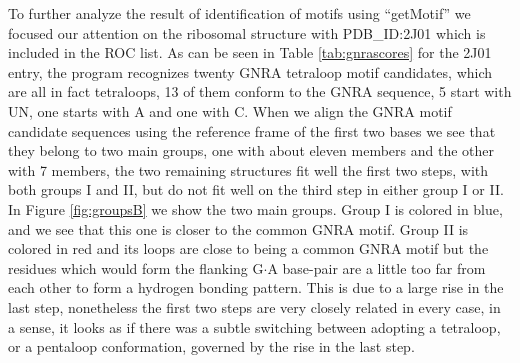 To  further  analyze the  result  of  identification  of motifs  using
``getMotif'' we focused our  attention on the ribosomal structure with
PDB\_ID:2J01 which is included in the ROC list.  As can be seen in Table
\ref{tab:gnrascores} for the 2J01 entry, the program recognizes twenty
GNRA tetraloop motif candidates, which  are all in fact tetraloops, 13
of them conform to the GNRA sequence, 5 start with UN, one starts with
A and  one with C.  When  we align the GNRA  motif candidate sequences
using the  reference frame  of the  first two bases  we see  that they
belong to two main groups, one with about eleven members and the other
with 7  members, the two remaining  structures fit well  the first two
steps, with  both groups I and  II, but do  not fit well on  the third
step in either group I or  II. In Figure \ref{fig:groupsB} we show the
two main groups. Group I is colored  in blue, and we see that this one
is closer to the common GNRA motif. Group II is colored in red and its
loops are  close to being a  common GNRA motif but  the residues which
would form the flanking G$\cdot$A  base-pair are a little too far from
each other to form a hydrogen  bonding pattern. This is due to a large
rise  in the  last  step, nonetheless  the  first two  steps are  very
closely related in every case, in a  sense, it looks as if there was a
subtle  switching  between  adopting   a  tetraloop,  or  a  pentaloop
conformation, governed by the rise in the last step.

